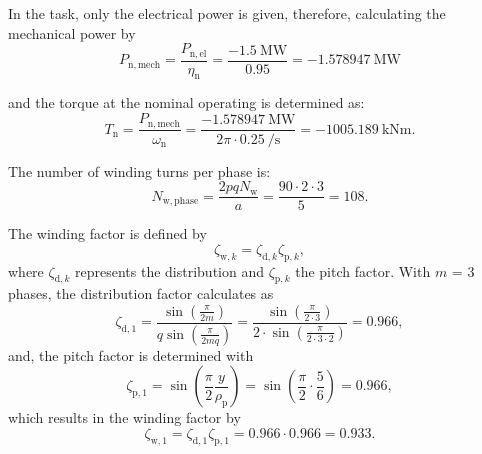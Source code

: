 \begin{solutionblock}
    In the task, only the electrical power is given, therefore, calculating the mechanical power by
    $$ P_{\mathrm{n,mech}} = \frac{P_{\mathrm{n,el}}}{\eta_{\mathrm{n}}} = \frac{\SI{-1.5}{\mega\watt}}{0.95} = \SI{-1.578947}{\mega\watt}$$

    and the torque at the nominal operating is determined as:
    $$ T_{\mathrm{n}} = \frac{P_{\mathrm{n,mech}}}{\omega_{\mathrm{n}}} = \frac{\SI{-1.578947}{\mega\watt}}{2\pi \cdot \SI{0.25}{\per\second}} = \SI{-1005.189}{\kilo\newton\metre}.$$
\end{solutionblock}


\begin{solutionblock}
    The number of winding turns per phase is:
    $$
        N_{\mathrm{w,phase}} = \frac{2p q N_{\mathrm{w}}}{a} = \frac{90 \cdot 2 \cdot 3}{5} = 108.
    $$
\end{solutionblock}



\begin{solutionblock}
    The winding factor is defined by
    $$ \zeta_{\mathrm{w,}k} = \zeta_{\mathrm{d,}k} \zeta_{\mathrm{p,}k}, $$
    where $\zeta_{\mathrm{d,}k}$ represents the distribution and $\zeta_{\mathrm{p,}k}$ the pitch factor.
    With $m$ = 3 phases, the distribution factor calculates as
    $$\zeta_{\mathrm{d,}1} = \frac{\sin\left(\frac{\pi}{2m} \right)}{q\sin\left(\frac{\pi}{2mq} \right)}
        = \frac{\sin\left(\frac{\pi}{2\cdot3}\right)}{2 \cdot \sin\left(\frac{\pi}{2\cdot3\cdot 2} \right)}
        = 0.966,
    $$
    and, the pitch factor is determined with
    $$
        \zeta_{\mathrm{p,}1} = \sin\left(\frac{\pi}{2} \frac{y}{\rho_{\mathrm{p}}}\right)
        = \sin\left(\frac{\pi}{2} \cdot \frac{5}{6} \right) = 0.966,
    $$
    which results in the winding factor by
    $$ \zeta_{\mathrm{w,}1} =  \zeta_{\mathrm{d,}1}  \zeta_{\mathrm{p,}1} = 0.966 \cdot 0.966 = 0.933. $$

\end{solutionblock}


